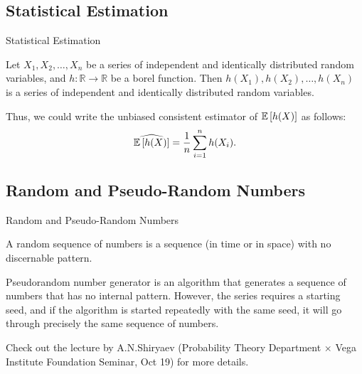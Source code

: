 \subsection{Statistical Estimation}
    \begin{frame}{Statistical Estimation}
        \begin{lemma}
            Let $X_1, X_2, \dots, X_n$ be a series of independent and identically distributed random variables, and $h: \mathbb{R} \to \mathbb{R}$ be a borel function. Then $h(X_1), h(X_2), \dots, h(X_n)$ is a series of independent and identically distributed random variables.
        \end{lemma}
        Thus, we could write the unbiased consistent estimator of $\mathbb{E} \left[h(X)\right]$ as follows:
        \begin{equation}
            \widehat{\mathbb{E} \left[h(X)\right]} = \frac{1}{n} \sum_{i=1}^n h(X_i).
        \end{equation}
    \end{frame}

\subsection{Random and Pseudo-Random Numbers}
    \begin{frame}{Random and Pseudo-Random Numbers}
        \begin{definition}
            A random sequence of numbers is a sequence (in time or in space) with no discernable pattern.
        \end{definition}
        \begin{definition}
            Pseudorandom number generator is an algorithm that generates a sequence of numbers that has no internal pattern. However, the series requires a starting seed, and if the algorithm is started repeatedly with the same seed, it will go through precisely the same sequence of numbers.
        \end{definition}

        Check out the lecture by A.N.Shiryaev (Probability Theory Department $\times$ Vega Institute Foundation Seminar, Oct 19) for more details.
    \end{frame}

